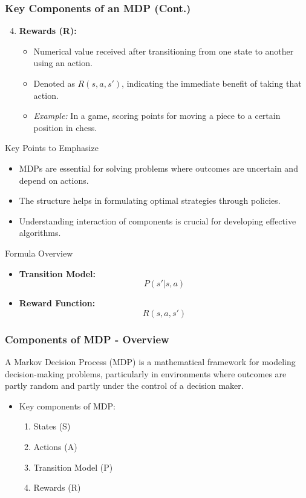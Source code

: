 \documentclass[aspectratio=169]{beamer}
\begin{document}
\begin{frame}[fragile]
    \frametitle{Key Components of an MDP (Cont.)}
    \begin{enumerate}
        \setcounter{enumi}{3} %
        \item \textbf{Rewards (R):}
        \begin{itemize}
            \item Numerical value received after transitioning from one state to another using an action.
            \item Denoted as $R(s, a, s')$, indicating the immediate benefit of taking that action.
            \item \textit{Example:} In a game, scoring points for moving a piece to a certain position in chess.
        \end{itemize}
    \end{enumerate}

    \begin{block}{Key Points to Emphasize}
        \begin{itemize}
            \item MDPs are essential for solving problems where outcomes are uncertain and depend on actions.
            \item The structure helps in formulating optimal strategies through policies.
            \item Understanding interaction of components is crucial for developing effective algorithms.
        \end{itemize}
    \end{block}
    
    \begin{block}{Formula Overview}
        \begin{itemize}
            \item \textbf{Transition Model:} 
            \[
            P(s'|s, a)
            \]
            \item \textbf{Reward Function:}
            \[
            R(s, a, s')
            \]
        \end{itemize}
    \end{block}
\end{frame}

\begin{frame}[fragile]
    \frametitle{Components of MDP - Overview}
    A Markov Decision Process (MDP) is a mathematical framework for modeling decision-making problems, particularly in environments where outcomes are partly random and partly under the control of a decision maker. 
    \begin{itemize}
        \item Key components of MDP:
        \begin{enumerate}
            \item States (S)
            \item Actions (A)
            \item Transition Model (P)
            \item Rewards (R)
        \end{enumerate}
    \end{itemize}
\end{frame}
\end{document}

